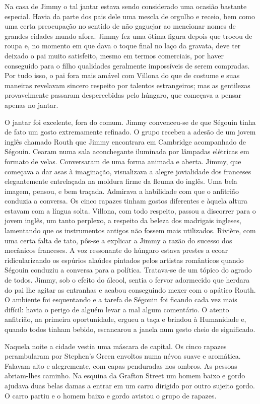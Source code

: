 Na casa de Jimmy o tal jantar estava sendo considerado uma ocasião
bastante especial. Havia da parte dos pais dele uma mescla de orgulho
e receio, bem como uma certa preocupação no sentido de não gaguejar ao
mencionar nomes de grandes cidades mundo afora. Jimmy fez uma ótima
figura depois que trocou de roupa e, no momento em que dava o toque
final no laço da gravata, deve ter deixado o pai muito satisfeito,
mesmo em termos comerciais, por haver conseguido para o filho
qualidades geralmente impossíveis de serem compradas. Por tudo isso,
o pai fora mais amável com Villona do que de costume e suas maneiras
revelavam sincero respeito por talentos estrangeiros; mas as
gentilezas provavelmente passaram despercebidas pelo húngaro, que
começava a pensar apenas no jantar.

O jantar foi excelente, fora do comum. Jimmy convenceu-se de que
Ségouin tinha de fato um gosto extremamente refinado. O grupo recebeu
a adesão de um jovem inglês chamado Routh que Jimmy encontrara em
Cambridge acompanhado de Ségouin. Cearam numa sala aconchegante
iluminada por lâmpadas elétricas
em formato de velas. Conversaram de uma forma animada e aberta. Jimmy,
que começava a dar asas à imaginação, visualizava a alegre jovialidade
dos franceses elegantemente entrelaçada na moldura firme da fleuma do
inglês. Uma bela imagem, pensou, e bem traçada. Admirava a habilidade
com que o anfitrião conduzia a conversa. Os cinco rapazes tinham
gostos diferentes e àquela altura estavam com a língua solta. Villona,
com todo respeito, passou a discorrer para o jovem inglês, um tanto
perplexo, a respeito da beleza dos madrigais ingleses, lamentando
que os instrumentos antigos não fossem mais utilizados. Rivière, com
uma certa falta de tato, pôs-se a explicar a Jimmy a razão do sucesso
dos mecânicos franceses. A voz ressonante do húngaro estava prestes a
ecoar ridicularizando os espúrios alaúdes pintados pelos artistas
românticos quando Ségouin conduziu a conversa para a política.
Tratava-se de um tópico do agrado de todos. Jimmy, sob o efeito do
álcool, sentia o fervor adormecido que herdara do pai lhe agitar as
entranhas e acabou conseguindo mexer com o apático Routh. O ambiente
foi esquentando e a tarefa de Ségouin foi ficando cada vez mais
difícil: havia o perigo de alguém levar a mal algum comentário. O
atento anfitrião, na primeira oportunidade, ergueu a taça e brindou à
Humanidade e, quando todos tinham bebido, escancarou a janela num
gesto cheio de significado.

Naquela noite a cidade vestia uma máscara de capital. Os cinco rapazes
perambularam por Stephen's Green envoltos numa névoa suave e
aromática. Falavam alto e alegremente, com capas penduradas nos
ombros. As pessoas abriam-lhes caminho. Na esquina da Grafton Street
um homem baixo e gordo ajudava duas belas damas a entrar em um carro
dirigido por outro sujeito gordo. O carro partiu e o homem baixo e
gordo avistou o grupo de rapazes.

